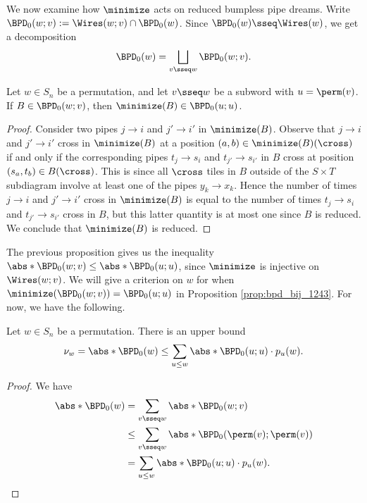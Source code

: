 We now examine how $\minimize$ acts on reduced bumpless pipe dreams.
Write $\BPD_0(w;v) := \Wires(w;v)\cap \BPD_0(w)$.
Since $\BPD_0(w)\sseq \Wires(w)$, we get a decomposition \[
    \BPD_0(w) = \bigsqcup_{v\sseq w} \BPD_0(w;v).
\]

\begin{proposition}
\label{prop:bpd_include}
    Let $w\in S_n$ be a permutation, and let $v\sseq w$ be a subword with $u = \perm(v)$.
    If $B\in \BPD_0(w;v)$, then $\minimize(B) \in \BPD_0(u;u)$.
\end{proposition}

\begin{proof}
    Consider two pipes $j\to i$ and $j'\to i'$ in $\minimize(B)$.
    Observe that $j\to i$ and $j'\to i'$ cross in $\minimize(B)$ at a position $(a,b)\in \minimize(B)(\cross)$ if and only if the corresponding pipes $t_j\to s_i$ and $t_{j'}\to s_{i'}$ in $B$ cross at position $(s_a,t_b)\in B(\cross)$.
    This is since all $\cross$ tiles in $B$ outside of the $S\times T$ subdiagram involve at least one of the pipes $y_k\to x_k$.
    Hence the number of times $j\to i$ and $j'\to i'$ cross in $\minimize(B)$ is equal to the number of times $t_j\to s_i$ and $t_{j'}\to s_{i'}$ cross in $B$,
    but this latter quantity is at most one since $B$ is reduced.
    We conclude that $\minimize(B)$ is reduced.
\end{proof}

The previous proposition gives us the inequality $\abs*{\BPD_0(w;v)} \leq \abs*{\BPD_0(u;u)}$, since $\minimize$ is injective on $\Wires(w;v)$.
We will give a criterion on $w$ for when $\minimize(\BPD_0(w;v)) = \BPD_0(u;u)$ in Proposition \ref{prop:bpd_bij_1243}.
For now, we have the following.

\begin{corollary}
\label{cor:schub_ub}
    Let $w\in S_n$ be a permutation.
    There is an upper bound \[
        \nu_w = \abs*{\BPD_0(w)}
        \leq \sum_{u\leq w} \abs*{\BPD_0(u;u)}\cdot p_u(w).
    \]
\end{corollary}

\begin{proof}
    We have \begin{align*}
        \abs*{\BPD_0(w)}
        &= \sum_{v\sseq w} \abs*{\BPD_0(w;v)} \\
        &\leq \sum_{v\sseq w} \abs*{\BPD_0(\perm(v);\perm(v))} \\
        &= \sum_{u\leq w} \abs*{\BPD_0(u;u)} \cdot p_u(w). \qedhere
    \end{align*}
\end{proof}

